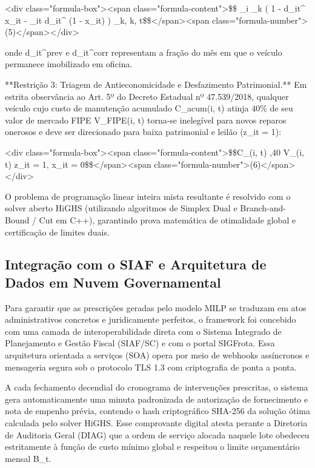 \documentclass[12pt,a4paper]{article}
\begin{document}
<div class="formula-box"><span class="formula-content">\$\$ \sum\_{i \in {}\_k} \left( 1 - d\_{it}^{} x\_{it} - \_{it} d\_{it}^{} (1 - x\_{it}) \right) \ge \gamma\_k, \quad \forall k, t\$\$</span><span class="formula-number">(5)</span></div>

onde d\_{it}^{prev} e d\_{it}^{corr} representam a fração do mês em que o veículo permanece imobilizado em oficina.

**Restrição 3: Triagem de Antieconomicidade e Desfazimento Patrimonial.** Em estrita observância ao Art. 5º do Decreto Estadual nº 47.539/2018, qualquer veículo cujo custo de manutenção acumulado C\_{acum}(i, t) atinja 40\% de seu valor de mercado FIPE V\_{FIPE}(i, t) torna-se inelegível para novos reparos onerosos e deve ser direcionado para baixa patrimonial e leilão (z\_{it} = 1):

<div class="formula-box"><span class="formula-content">\$\$C\_{}(i, t) ,40 \times V\_{}(i, t) \implies z\_{it} = 1, \quad x\_{it} = 0\$\$</span><span class="formula-number">(6)</span></div>

O problema de programação linear inteira mista resultante é resolvido com o solver aberto HiGHS (utilizando algoritmos de Simplex Dual e Branch-and-Bound / Cut em C++), garantindo prova matemática de otimalidade global e certificação de limites duais.


\subsection{Integração com o SIAF e Arquitetura de Dados em Nuvem Governamental}

Para garantir que as prescrições geradas pelo modelo MILP se traduzam em atos administrativos concretos e juridicamente perfeitos, o framework foi concebido com uma camada de interoperabilidade direta com o Sistema Integrado de Planejamento e Gestão Fiscal (SIAF/SC) e com o portal SIGFrota. Essa arquitetura orientada a serviços (SOA) opera por meio de webhooks assíncronos e mensageria segura sob o protocolo TLS 1.3 com criptografia de ponta a ponta.

A cada fechamento decendial do cronograma de intervenções prescritas, o sistema gera automaticamente uma minuta padronizada de autorização de fornecimento e nota de empenho prévia, contendo o hash criptográfico SHA-256 da solução ótima calculada pelo solver HiGHS. Esse comprovante digital atesta perante a Diretoria de Auditoria Geral (DIAG) que a ordem de serviço alocada naquele lote obedeceu estritamente à função de custo mínimo global e respeitou o limite orçamentário mensal B\_t.
\end{document}
